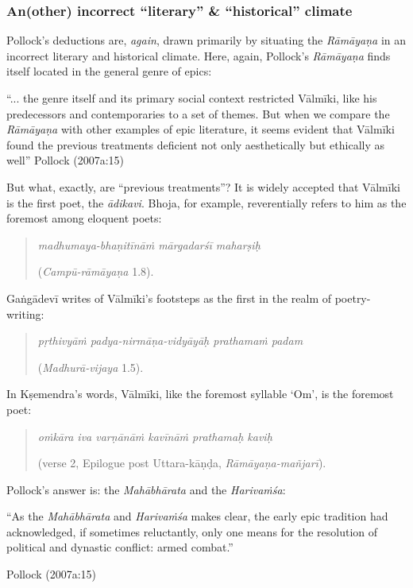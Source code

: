 \subsubsection{An(other) incorrect “literary” \& “historical” climate}\label{sec1.2.3.1}

Pollock’s deductions are, {\sl again}, drawn primarily by situating the {\sl Rāmāyaṇa} in an incorrect literary and historical climate. Here, again, Pollock’s {\sl Rāmāyaṇa} finds itself located in the general genre of epics:

\begin{myquote}
“... the genre itself and its primary social context restricted Vālmīki, like his predecessors and contemporaries to a set of themes. But when we compare the {\sl Rāmāyaṇa} with other examples of epic literature, it seems evident that Vālmīki found the previous treatments deficient not only aesthetically but ethically as well”
\hfill Pollock (2007a:15)
\end{myquote}

But what, exactly, are “previous treatments”? It is widely accepted that Vālmīki is the first poet, the {\sl ādikavi}. Bhoja, for example, reverentially refers to him as the foremost among eloquent poets:

\begin{quote}
{\sl madhumaya-bhaṇitīnāṁ mārgadarśī maharṣiḥ} 

\hfill ({\sl Campū-rāmāyaṇa} 1.8). 
\end{quote}

Gaṅgādevī writes of Vālmīki’s footsteps as the first in the realm of poetry-writing:   

\begin{quote}
{\sl pṛthivyāṁ padya-nirmāṇa-vidyāyāḥ prathamaṁ padam} 

\hfill ({\sl Madhurā-vijaya} 1.5). 
\end{quote}

In Kṣemendra’s words, Vālmīki, like the foremost syllable ‘Om’, is the foremost poet:

\begin{quote}
{\sl oṁkāra iva varṇānāṁ kavīnāṁ prathamaḥ kaviḥ}

\hfill (verse 2, Epilogue post Uttara-kāṇḍa, {\sl Rāmāyaṇa-mañjarī}).
\end{quote}

Pollock’s answer is: the {\sl Mahābhārata} and the {\sl Harivaṁśa}:

\begin{myquote}
“As the {\sl Mahābhārata} and {\sl Harivaṁśa} makes clear, the early epic tradition had acknowledged, if sometimes reluctantly, only one means for the resolution of political and dynastic conflict: armed combat.”

\hfill Pollock (2007a:15)
\end{myquote}

